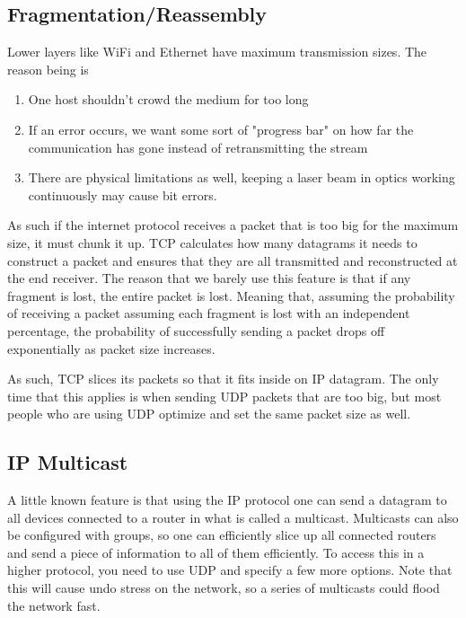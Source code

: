 \begin{aside}
\subsection{Fragmentation/Reassembly}

Lower layers like WiFi and Ethernet have maximum transmission sizes. The reason being is

\begin{enumerate}
  \item One host shouldn't crowd the medium for too long
  \item If an error occurs, we want some sort of "progress bar" on how far the communication has gone instead of retransmitting the stream
  \item There are physical limitations as well, keeping a laser beam in optics working continuously may cause bit errors.
\end{enumerate}

As such if the internet protocol receives a packet that is too big for the maximum size, it must chunk it up. TCP calculates how many datagrams it needs to construct a packet and ensures that they are all transmitted and reconstructed at the end receiver. The reason that we barely use this feature is that if any fragment is lost, the entire packet is lost. Meaning that, assuming the probability of receiving a packet assuming each fragment is lost with an independent percentage, the probability of successfully sending a packet drops off exponentially as packet size increases.

As such, TCP slices its packets so that it fits inside on IP datagram. The only time that this applies is when sending UDP packets that are too big, but most people who are using UDP optimize and set the same packet size as well.

\subsection{IP Multicast}

A little known feature is that using the IP protocol one can send a datagram to all devices connected to a router in what is called a multicast. Multicasts can also be configured with groups, so one can efficiently slice up all connected routers and send a piece of information to all of them efficiently. To access this in a higher protocol, you need to use UDP and specify a few more options. Note that this will cause undo stress on the network, so a series of multicasts could flood the network fast.


\end{aside}
